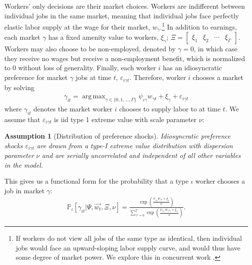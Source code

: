 \documentclass[12pt]{article}
\def\ig{\iota\gamma}
\def\g{\gamma}
\def\i{\iota}
\DeclareMathOperator*{\argmax}{arg\,max}
\renewcommand{\P}{\mathbb {P}}
\theoremstyle{definition}
\theoremstyle{plain}
\newtheorem{assumption}[theorem]{Assumption}
\def\ve{\varepsilon}
\begin{document}
Workers' only decisions are their market choices. Workers are indifferent between individual jobs in the same market, meaning that individual jobs face perfectly elastic labor supply at the wage for their market, $w_{\g}$.\footnote{If workers do not view all jobs of the same type as identical, then individual jobs would face an upward-sloping labor supply curve, and would thus have some degree of market power. We explore this in concurrent work \citep{ModenesiFogel2021}.} In addition to earnings, each market $\g$ has a fixed amenity value to workers, $\xi_{\g}$; $\Xi = \begin{bmatrix}	\xi_1 & \xi_2 & \cdots &  \xi_{\Gamma}	\end{bmatrix}$.   Workers may also choose to be non-employed, denoted by $\g=0$, in which case they receive no wages but receive a non-employment benefit, which is normalized to 0 without loss of generality. Finally, each worker $i$ has an idiosyncratic preference for market $\g$ jobs at time $t$, $\ve_{i\g t}$. Therefore, worker $i$ chooses a market by solving
\begin{align}
\g_{it} = \argmax_{\g \in \{0,1,\dots,\Gamma\}} \psi_{\ig} w_{\g t} + \xi_{\g} + \ve_{i\g t} \label{eq:worker_max}
\end{align}
where $\g_{it}$ denotes the market worker $i$ chooses to supply labor to at time $t$. We assume that $\ve_{i\g t}$ is iid type 1 extreme value with scale parameter $\nu$:

\begin{assumption}[Distribution of preference shocks]
	\label{ass:taste_shocks}
	Idiosyncratic preference shocks $\ve_{i\g t}$ are drawn from a type-I extreme value distribution with dispersion parameter $\nu$ and are serially uncorrelated and independent of all other variables in the model.
\end{assumption}


 This gives us a functional form for the probability that a type $\i$ worker chooses a job in market $\g$:
\begin{align}
\P_{\i}[\g_{it}|\Psi,\vec{w_t},\Xi,\nu]= \frac{\exp \left( \frac{\psi_{\ig} w_{\g t} + \xi_{\g}}{\nu} \right) }{ \sum\limits_{\g'=0}^{\Gamma} \exp \left( \frac{\psi_{\ig'} w_{\g' t} + \xi_{\g'}}{\nu} \right) }. \label{eq:emp_probs}
\end{align} 
\end{document}
